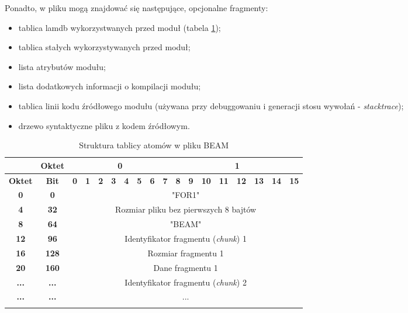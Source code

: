 Ponadto, w pliku mogą znajdować się następujące, opcjonalne fragmenty:
\begin{itemize}
\item tablica lamdb wykorzystwanych przed moduł (tabela \ref{table:atomTable});
\item tablica stałych wykorzystywanych przed moduł;
\item lista atrybutów modułu;
\item lista dodatkowych informacji o kompilacji modułu;
\item tablica linii kodu źródłowego modułu (używana przy debuggowaniu i generacji stosu wywołań - \emph{stacktrace});
\item drzewo syntaktyczne pliku z kodem źródłowym.
\end{itemize}

\begin{longtable}{|c|c|c|c|c|c|c|c|c|c|c|c|c|c|c|c|c|c|}
\hline
         & \textbf{Oktet} & \multicolumn{8}{|c|}{\textbf{0}} & \multicolumn{8}{|c|}{\textbf{1}} \\
\hline
\textbf{Oktet} & \textbf{Bit} & \textbf{0} & \textbf{1} & \textbf{2} & \textbf{3} & \textbf{4} & \textbf{5} & \textbf{6} & \textbf{7} & \textbf{8} & \textbf{9} & \textbf{10} & \textbf{11} & \textbf{12} & \textbf{13} & \textbf{14} & \textbf{15}\\
\hline
\textbf{0} & \textbf{0} & \multicolumn{16}{|c|}{"FOR1"} \\[2ex]
\hline
\textbf{4} & \textbf{32} & \multicolumn{16}{|c|}{Rozmiar pliku bez pierwszych 8 bajtów}\\[2ex]
\hline
\textbf{8} & \textbf{64} & \multicolumn{16}{|c|}{"BEAM"} \\[2ex]
\hline
\textbf{12} & \textbf{96} & \multicolumn{16}{|c|}{Identyfikator fragmentu (\emph{chunk}) 1}\\[2ex]
\hline
\textbf{16} & \textbf{128} & \multicolumn{16}{|c|}{Rozmiar fragmentu 1} \\[2ex]
\hline
\textbf{20} & \textbf{160} & \multicolumn{16}{|c|}{Dane fragmentu 1} \\[10ex]
\hline
\textbf{...} & \textbf{...} & \multicolumn{16}{|c|}{Identyfikator fragmentu (\emph{chunk}) 2}\\[2ex]
\hline
\textbf{...} & \textbf{...} & \multicolumn{16}{|c|}{...} \\
\hline
\caption{Struktura tablicy atomów w pliku BEAM}
\label{table:atomTable} \\
\end{longtable}

